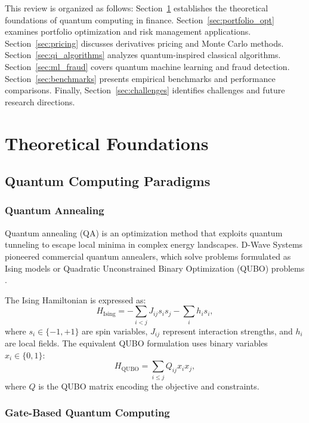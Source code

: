 \documentclass[12pt]{article}
\numberwithin{equation}{section}
\begin{document}
This review is organized as follows: Section~\ref{sec:foundations} establishes the theoretical foundations of quantum computing in finance. Section~\ref{sec:portfolio_opt} examines portfolio optimization and risk management applications. Section~\ref{sec:pricing} discusses derivatives pricing and Monte Carlo methods. Section~\ref{sec:qi_algorithms} analyzes quantum-inspired classical algorithms. Section~\ref{sec:ml_fraud} covers quantum machine learning and fraud detection. Section~\ref{sec:benchmarks} presents empirical benchmarks and performance comparisons. Finally, Section~\ref{sec:challenges} identifies challenges and future research directions.

\section{Theoretical Foundations}
\label{sec:foundations}

\subsection{Quantum Computing Paradigms}

\subsubsection{Quantum Annealing}

Quantum annealing (QA) is an optimization method that exploits quantum tunneling to escape local minima in complex energy landscapes. D-Wave Systems pioneered commercial quantum annealers, which solve problems formulated as Ising models or Quadratic Unconstrained Binary Optimization (QUBO) problems \citep{Kadowaki1998QA}.

The Ising Hamiltonian is expressed as:
\begin{equation}
H_{\text{Ising}} = -\sum_{i<j} J_{ij} s_i s_j - \sum_i h_i s_i,
\end{equation}
where $s_i \in \{-1, +1\}$ are spin variables, $J_{ij}$ represent interaction strengths, and $h_i$ are local fields. The equivalent QUBO formulation uses binary variables $x_i \in \{0,1\}$:
\begin{equation}
H_{\text{QUBO}} = \sum_{i \leq j} Q_{ij} x_i x_j,
\end{equation}
where $Q$ is the QUBO matrix encoding the objective and constraints.

\subsubsection{Gate-Based Quantum Computing}
\end{document}
